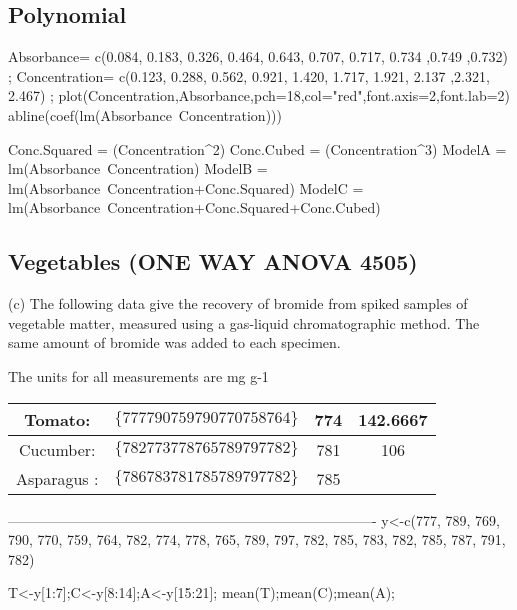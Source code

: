\subsection*{Polynomial}

Absorbance= c(0.084, 0.183, 0.326, 0.464, 0.643, 0.707, 0.717, 0.734 ,0.749 ,0.732) ;
Concentration= c(0.123, 0.288, 0.562, 0.921, 1.420, 1.717, 1.921, 2.137 ,2.321, 2.467) ;
plot(Concentration,Absorbance,pch=18,col="red",font.axis=2,font.lab=2)
abline(coef(lm(Absorbance~Concentration)))

Conc.Squared = (Concentration^2)
Conc.Cubed = (Concentration^3)
ModelA = lm(Absorbance~Concentration)
ModelB = lm(Absorbance~Concentration+Conc.Squared)
ModelC = lm(Absorbance~Concentration+Conc.Squared+Conc.Cubed)

\subsection{Vegetables (ONE WAY ANOVA 4505)}

(c) The following data give the recovery of bromide from spiked samples of vegetable matter, measured using a gas-liquid chromatographic method. The same amount of bromide was added to each specimen. 

The units for all measurements are  mg g-1

\begin{center}
	\begin{tabular}{|c|c|c|c|}
		Tomato: & $\{777 790 759 790 770 758 764\}$ & 774 & 142.6667
		\\ \hline
		
		Cucumber: & $\{782 773 778 765 789 797 782\}$ & 781 &  106\\ \hline
		
		Asparagus : & $\{786 783 781 785 789 797 782 \}$& 785 & \\ \hline
	\end{tabular} 
\end{center}


-------------------------------------------------------------------------------
y<-c(777, 789, 769, 790, 770, 759, 764, 782, 774, 778, 765, 789, 
797, 782, 785, 783, 782, 785, 787, 791, 782)



T<-y[1:7];C<-y[8:14];A<-y[15:21];
mean(T);mean(C);mean(A);


